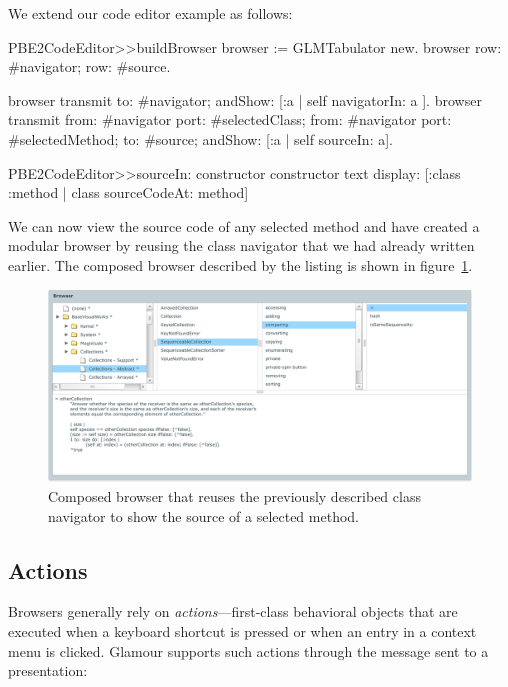\documentclass[a4paper,10pt,twoside]{book}
\begin{document}
We extend our code editor example as follows:

\begin{code}{}
PBE2CodeEditor>>buildBrowser 
	browser := GLMTabulator new.
	browser 
		row: #navigator;
		row: #source.
		
	browser transmit to: #navigator; andShow:  [:a | self navigatorIn: a ]. 
	browser transmit
		from:  #navigator port: #selectedClass;
		from: #navigator port: #selectedMethod;
		to: #source;
		andShow:  [:a | self sourceIn: a].

PBE2CodeEditor>>sourceIn: constructor
	constructor text
		display: [:class :method | class sourceCodeAt: method] 
\end{code}


We can now view the source code of any selected method and have
created a modular browser by reusing the class navigator that we had
already written earlier. The composed browser described by the listing
is shown in figure~\ref{fig:composed-browser}.

\begin{figure}[htbp]
\centerline{\includegraphics[width=\linewidth]{classbrowser.pdf}}
\caption{Composed browser that reuses the previously described class navigator to show the source of a selected method.}
\label{fig:composed-browser}
\end{figure}

\subsection{Actions}
\label{sec:tutorial/actions}

Browsers generally rely on \emph{actions}---first-class behavioral objects that are executed when a keyboard shortcut is pressed or when an entry in a context menu is clicked. Glamour supports such actions through the  message sent to a presentation:
\end{document}
